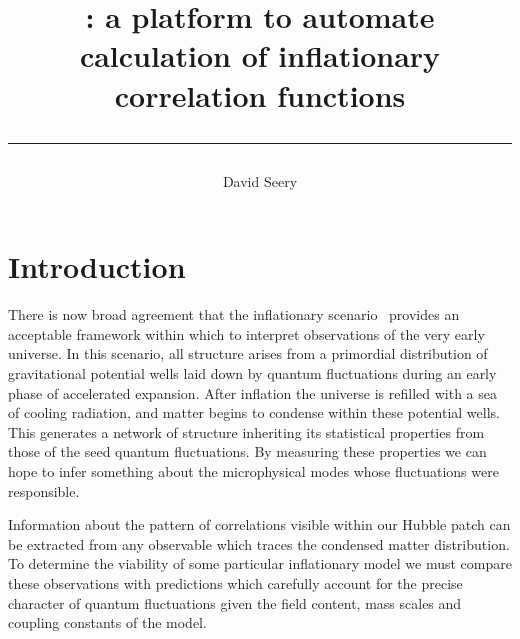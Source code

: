 \documentclass[11pt,a4paper]{article}
\newcommand{\packagefont}{\sffamily}
\newcommand{\CppTransport}{{\packagefont CppTransport}}
\begin{document}
\title{\selectfont {\CppTransport}: a platform to
automate calculation of inflationary correlation functions
\vspace{5mm}\hrule}
\author{\selectfont David Seery}



\abstract{}

\maketitle
\newpage

\section{Introduction}
There is now broad agreement that the inflationary
scenario~\cite{Guth:1980zm,Starobinsky:1980te,Albrecht:1982wi,
Hawking:1981fz,Linde:1981mu,Linde:1983gd}
provides an acceptable framework within which to interpret
observations of the very early universe.
In this scenario, all structure arises from a primordial distribution
of gravitational potential wells laid down by quantum
fluctuations during an early phase of accelerated expansion.
After inflation the universe is refilled with a sea of cooling radiation,
and matter begins to condense within these potential wells.
This generates a network of structure inheriting its statistical
properties from those of the seed quantum fluctuations.
By measuring these properties we can hope
to infer something about the microphysical modes whose fluctuations
were responsible.

Information about the pattern of correlations visible within our Hubble patch
can be extracted from any observable which traces the condensed matter
distribution.
To determine the viability of some particular inflationary model
we must compare these observations with predictions
which carefully account for the precise character of quantum
fluctuations given the field content, mass scales and coupling constants of the model.
\end{document}

